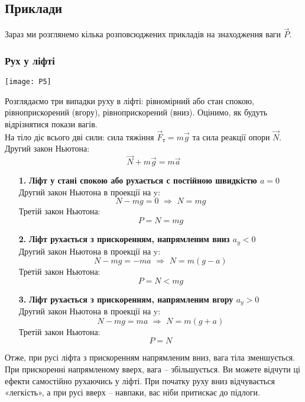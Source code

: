 \documentclass[a4paper,12pt]{article}
\begin{document}
\newpage
\subsection{Приклади}
Зараз ми розглянемо кілька розповсюджених прикладів на знаходження ваги $\vec{P}$.
\subsubsection{Рух у ліфті}
\begin{center}
\texttt{[image: P5]}
\end{center}
Розглядаємо три випадки руху в ліфті: рівномірний або стан спокою, рівноприскорений (вгору), рівноприскорений (вниз). Оцінимо, як будуть відрізнятися покази вагів. \\ \newline На тіло діє всього дві сили: сила тяжіння $\vec{F}_{\text{т}} = m\vec{g}$ та сила реакції опори $\vec{N}$.
\\ \newline Другий закон Ньютона: $$\vec{N} + m\vec{g} = m\vec{a}$$
\begin{itemize}
\item[\textcolor{EdErablue}{\textbf{1.}}] \textcolor{EdErablue}{ \textbf{Ліфт у стані спокою або рухається с постійною швидкістю $\boxed{a = 0}$}}\\ Другий закон Ньютона в проекції на y: $$N - mg = 0\,\,\Rightarrow\,\,N = mg$$ Третій закон Ньютона: $$P = N = mg$$
\item[\textcolor{EdErablue}{\textbf{2.}}] \textcolor{EdErablue}{ \textbf{Ліфт рухається з прискоренням, напрямленим вниз $\boxed{a_y < 0}$}}\\ Другий закон Ньютона в проекції на y: $$N - mg = -ma\,\,\Rightarrow\,\,N = m(g-a)$$ Третій закон Ньютона: $$P = N < mg $$
\item[\textcolor{EdErablue}{\textbf{3.}}] \textcolor{EdErablue}{ \textbf{Ліфт рухається з прискоренням, напрямленим вгору $\boxed{a_y > 0}$}}\\ Другий закон Ньютона в проекції на y: $$N - mg = ma\,\,\Rightarrow\,\,N = m(g+a)$$ Третій закон Ньютона: $$P = N$$
\newpage

\end{itemize}
Отже, при русі ліфта з прискоренням напрямленим вниз, вага тіла зменшується. При прискоренні напрямленому вверх, вага – збільшується. Ви можете відчути ці ефекти самостійно рухаючись у ліфті. При початку руху вниз відчувається «легкість», а  при русі вверх – навпаки, вас ніби притискає до підлоги. 
\end{document}
